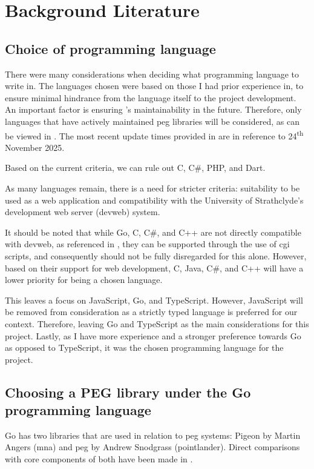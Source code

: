 \section{Background Literature}\label{backg}
\subsection{Choice of programming language}
There were many considerations when deciding what programming language to write \lintexspaced in. The languages chosen were based on those I had prior experience in, to ensure minimal hindrance from the language itself to the project development. An important factor is ensuring \lintex's maintainability in the future. Therefore, only languages that have actively maintained \acrfull{peg} libraries will be considered, as can be viewed in . The most recent update times provided in  are in reference to 24\textsuperscript{th} November 2025.



Based on the current criteria, we can rule out C, C\#, PHP, and Dart.

As many languages remain, there is a need for stricter criteria: suitability to be used as a web application and compatibility with the University of Strathclyde's development web server (devweb) system.



It should be noted that while Go, C, C\#, and C++ are not directly compatible with devweb, as referenced in , they can be supported through the use of \acrfull{cgi} scripts, and consequently should not be fully disregarded for this alone. However, based on their support for web development, C, Java, C\#, and C++ will have a lower priority for being a chosen language.

This leaves a focus on JavaScript, Go, and TypeScript. However, JavaScript will be removed from consideration as a strictly typed language is preferred for our context. Therefore, leaving Go and TypeScript as the main considerations for this project. Lastly, as I have more experience and a stronger preference towards Go as opposed to TypeScript, it was the chosen programming language for the project.

\subsection{\nmu Choosing \nmu a PEG library under the Go programming language}\label{backg:peg_library_choice}
Go has two libraries that are used in relation to \acrshort{peg} systems: Pigeon by Martin Angers (mna) and \acrshort{peg} by Andrew Snodgrass (pointlander). Direct comparisons with core components of both have been made in .

